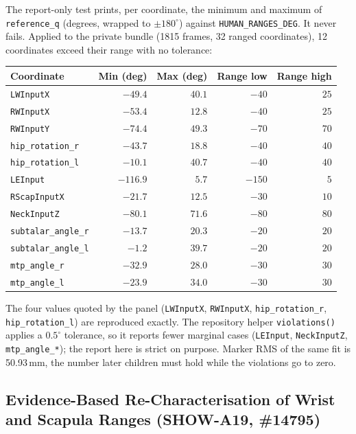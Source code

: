 \documentclass[11pt,a4paper]{article}
\begin{document}
The report-only test
 prints, per coordinate,
the minimum and maximum of \texttt{reference\_q} (degrees, wrapped to
$\pm180^{\circ}$) against \texttt{HUMAN\_RANGES\_DEG}.  It never fails.  Applied
to the private bundle (1815 frames, 32 ranged coordinates), 12 coordinates
exceed their range with no tolerance:

\begin{center}
\small
\begin{tabular}{@{}lrrrr@{}}
\toprule
Coordinate & Min (deg) & Max (deg) & Range low & Range high \\
\midrule
\texttt{LWInputX} & $-49.4$ & $40.1$ & $-40$ & $25$ \\
\texttt{RWInputX} & $-53.4$ & $12.8$ & $-40$ & $25$ \\
\texttt{RWInputY} & $-74.4$ & $49.3$ & $-70$ & $70$ \\
\texttt{hip\_rotation\_r} & $-43.7$ & $18.8$ & $-40$ & $40$ \\
\texttt{hip\_rotation\_l} & $-10.1$ & $40.7$ & $-40$ & $40$ \\
\texttt{LEInput} & $-116.9$ & $5.7$ & $-150$ & $5$ \\
\texttt{RScapInputX} & $-21.7$ & $12.5$ & $-30$ & $10$ \\
\texttt{NeckInputZ} & $-80.1$ & $71.6$ & $-80$ & $80$ \\
\texttt{subtalar\_angle\_r} & $-13.7$ & $20.3$ & $-20$ & $20$ \\
\texttt{subtalar\_angle\_l} & $-1.2$ & $39.7$ & $-20$ & $20$ \\
\texttt{mtp\_angle\_r} & $-32.9$ & $28.0$ & $-30$ & $30$ \\
\texttt{mtp\_angle\_l} & $-23.9$ & $34.0$ & $-30$ & $30$ \\
\bottomrule
\end{tabular}
\end{center}

The four values quoted by the panel (\texttt{LWInputX}, \texttt{RWInputX},
\texttt{hip\_rotation\_r}, \texttt{hip\_rotation\_l}) are reproduced exactly.
The repository helper \texttt{violations()} applies a $0.5^{\circ}$ tolerance,
so it reports fewer marginal cases (\texttt{LEInput}, \texttt{NeckInputZ},
\texttt{mtp\_angle\_*}); the report here is strict on purpose.  Marker RMS of
the same fit is 50.93\,mm, the number later children must hold while the
violations go to zero.

\subsection{Evidence-Based Re-Characterisation of Wrist and Scapula Ranges (SHOW-A19, \#14795)}
\label{sec:wrist-scapula-rom-evidence}
\end{document}
